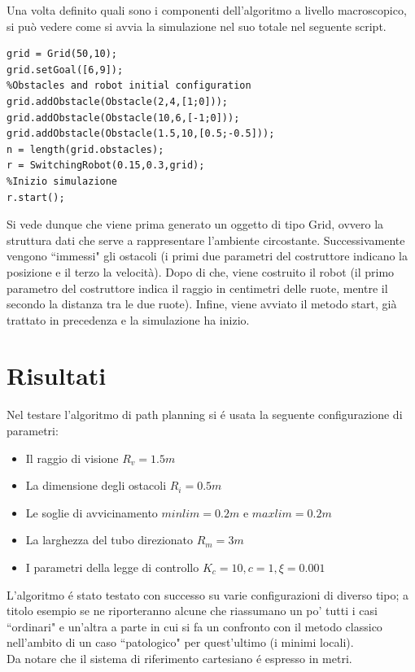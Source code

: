 \documentclass[14pt,a4paper]{extarticle}
\begin{document}
Una volta definito quali sono i componenti dell'algoritmo a livello macroscopico, si può vedere come si avvia la simulazione nel suo totale nel seguente script.
\begin{lstlisting}[caption=Istruzioni per avviare la simulazione]
grid = Grid(50,10);
grid.setGoal([6,9]);
%Obstacles and robot initial configuration
grid.addObstacle(Obstacle(2,4,[1;0]));
grid.addObstacle(Obstacle(10,6,[-1;0]));
grid.addObstacle(Obstacle(1.5,10,[0.5;-0.5]));
n = length(grid.obstacles);
r = SwitchingRobot(0.15,0.3,grid);
%Inizio simulazione
r.start();
\end{lstlisting}
Si vede dunque che viene prima generato un oggetto di tipo Grid, ovvero la struttura dati che serve a rappresentare l'ambiente circostante. Successivamente vengono ``immessi" gli ostacoli (i primi due parametri del costruttore indicano la posizione e il terzo la velocità). Dopo di che, viene costruito il robot (il primo parametro del costruttore indica il raggio in centimetri delle ruote, mentre il secondo la distanza tra le due ruote). Infine, viene avviato il metodo start, già trattato in precedenza e la simulazione ha inizio.
 
\newpage
\section{Risultati}
Nel testare l'algoritmo di path planning si é usata la seguente configurazione di parametri:
\begin{itemize}
\item Il raggio di visione \(R_v=1.5m\)
\item La dimensione degli ostacoli \(R_i=0.5m\)
\item Le soglie di avvicinamento \(minlim = 0.2m\) e \(maxlim=0.2m\)
\item La larghezza del tubo direzionato \(R_m=3m\)
\item I parametri della legge di controllo \(K_c=10, c=1, \xi=0.001\) 
\end{itemize}
L'algoritmo é stato testato con successo su varie configurazioni di diverso tipo; a titolo esempio se ne riporteranno alcune che riassumano un po' tutti i casi ``ordinari" e un'altra a parte in cui si fa un confronto con il metodo classico nell'ambito di un caso ``patologico" per quest'ultimo (i minimi locali).\\
Da notare che il sistema di riferimento cartesiano é espresso in metri.
\end{document}

